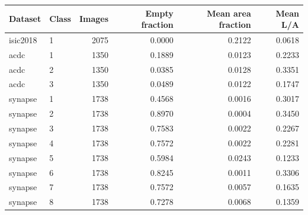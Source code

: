 \begin{tabular}{llrrrr}
Dataset & Class & Images & Empty fraction & Mean area fraction & Mean L/A \\
\hline
isic2018 & 1 & 2075 & 0.0000 & 0.2122 & 0.0618 \\
acdc & 1 & 1350 & 0.1889 & 0.0123 & 0.2233 \\
acdc & 2 & 1350 & 0.0385 & 0.0128 & 0.3351 \\
acdc & 3 & 1350 & 0.0489 & 0.0122 & 0.1747 \\
synapse & 1 & 1738 & 0.4568 & 0.0016 & 0.3017 \\
synapse & 2 & 1738 & 0.8970 & 0.0004 & 0.3450 \\
synapse & 3 & 1738 & 0.7583 & 0.0022 & 0.2267 \\
synapse & 4 & 1738 & 0.7572 & 0.0022 & 0.2281 \\
synapse & 5 & 1738 & 0.5984 & 0.0243 & 0.1233 \\
synapse & 6 & 1738 & 0.8245 & 0.0011 & 0.3306 \\
synapse & 7 & 1738 & 0.7572 & 0.0057 & 0.1635 \\
synapse & 8 & 1738 & 0.7278 & 0.0068 & 0.1359 \\
\end{tabular}
